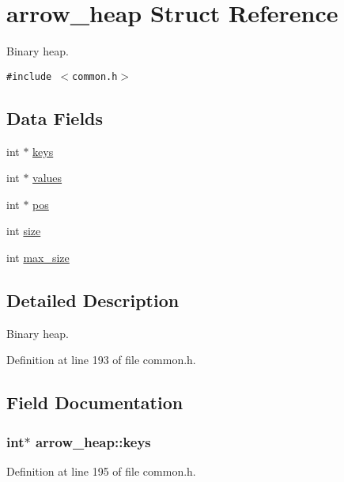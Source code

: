 \hypertarget{structarrow__heap}{
\section{arrow\_\-heap Struct Reference}
\label{structarrow__heap}
}
Binary heap.  


{\tt \#include $<$common.h$>$}

\subsection*{Data Fields}
\begin{CompactItemize}
\item 
int $\ast$ \hyperlink{structarrow__heap_663da189690098d1ad1bbc04701402f2}{keys}
\item 
int $\ast$ \hyperlink{structarrow__heap_e2641f7a933ecb92d32acd3a50caa442}{values}
\item 
int $\ast$ \hyperlink{structarrow__heap_a39c7b18964b26c78a96f51406d8d7ab}{pos}
\item 
int \hyperlink{structarrow__heap_afeff09d63b1f6ec6fc910d3407972de}{size}
\item 
int \hyperlink{structarrow__heap_e668dd3f450ba07df5998b8d084e6949}{max\_\-size}
\end{CompactItemize}


\subsection{Detailed Description}
Binary heap. 

Definition at line 193 of file common.h.

\subsection{Field Documentation}
\hypertarget{structarrow__heap_663da189690098d1ad1bbc04701402f2}{
\subsubsection[{keys}]{\setlength{\rightskip}{0pt plus 5cm}int$\ast$ {\bf arrow\_\-heap::keys}}}
\label{structarrow__heap_663da189690098d1ad1bbc04701402f2}




Definition at line 195 of file common.h.

